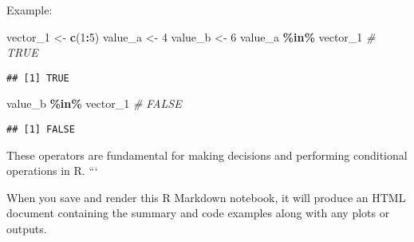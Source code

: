 \documentclass[
]{article}
\newenvironment{Shaded}{\begin{snugshade}}{\end{snugshade}}
\newcommand{\CommentTok}[1]{\textcolor[rgb]{0.56,0.35,0.01}{\textit{#1}}}
\newcommand{\DecValTok}[1]{\textcolor[rgb]{0.00,0.00,0.81}{#1}}
\newcommand{\FunctionTok}[1]{\textcolor[rgb]{0.13,0.29,0.53}{\textbf{#1}}}
\newcommand{\NormalTok}[1]{#1}
\newcommand{\OtherTok}[1]{\textcolor[rgb]{0.56,0.35,0.01}{#1}}
\newcommand{\SpecialCharTok}[1]{\textcolor[rgb]{0.81,0.36,0.00}{\textbf{#1}}}
\begin{document}
Example:

\begin{Shaded}
\begin{Highlighting}[]
\NormalTok{vector\_1 }\OtherTok{\textless{}{-}} \FunctionTok{c}\NormalTok{(}\DecValTok{1}\SpecialCharTok{:}\DecValTok{5}\NormalTok{)}
\NormalTok{value\_a }\OtherTok{\textless{}{-}} \DecValTok{4}
\NormalTok{value\_b }\OtherTok{\textless{}{-}} \DecValTok{6}
\NormalTok{value\_a }\SpecialCharTok{\%in\%}\NormalTok{ vector\_1  }\CommentTok{\# TRUE}
\end{Highlighting}
\end{Shaded}

\begin{verbatim}
## [1] TRUE
\end{verbatim}

\begin{Shaded}
\begin{Highlighting}[]
\NormalTok{value\_b }\SpecialCharTok{\%in\%}\NormalTok{ vector\_1  }\CommentTok{\# FALSE}
\end{Highlighting}
\end{Shaded}

\begin{verbatim}
## [1] FALSE
\end{verbatim}

These operators are fundamental for making decisions and performing
conditional operations in R. ```

When you save and render this R Markdown notebook, it will produce an
HTML document containing the summary and code examples along with any
plots or outputs.
\end{document}
